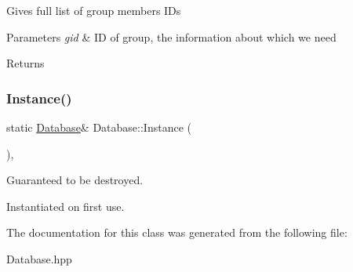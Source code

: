 Gives full list of group members I\+Ds 
\begin{DoxyParams}{Parameters}
{\em gid} & ID of group, the information about which we need \\
\hline
\end{DoxyParams}
\begin{DoxyReturn}{Returns}

\end{DoxyReturn}
\mbox{\label{class_database_aa0586187fb141218dfb7fd094e88ecef}} 
\subsubsection{\texorpdfstring{Instance()}{Instance()}}
{\footnotesize\ttfamily static \hyperlink{class_database}{Database}\& Database\+::\+Instance (\begin{DoxyParamCaption}{ }\end{DoxyParamCaption})\hspace{0.3cm}{\ttfamily [inline]}, {\ttfamily [static]}}

Guaranteed to be destroyed.

Instantiated on first use. 

The documentation for this class was generated from the following file\+:\begin{DoxyCompactItemize}
\item 
Database.\+hpp\end{DoxyCompactItemize}

